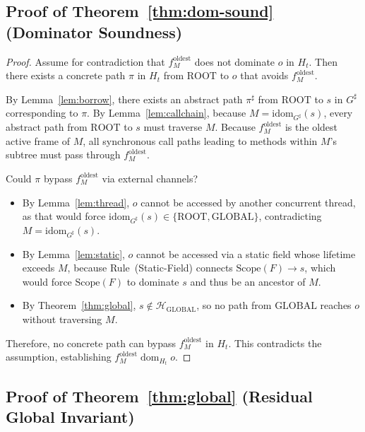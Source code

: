 \documentclass[12pt,a4paper]{article}
\newcommand{\GLOBAL}{\text{GLOBAL}}
\newcommand{\ROOT}{\text{ROOT}}
\newcommand{\idom}{\text{idom}}
\newcommand{\dom}{\mathrel{\text{dom}}}
\newcommand{\Scope}{\text{Scope}}
\begin{document}
\subsection{Proof of Theorem~\ref{thm:dom-sound} (Dominator Soundness)}
\label{sec:proof-thm-dom-sound}

\begin{proof}
Assume for contradiction that $f_M^{\text{oldest}}$ does not dominate $o$ in $H_t$. Then there exists a concrete path $\pi$ in $H_t$ from $\ROOT$ to $o$ that avoids $f_M^{\text{oldest}}$.

By Lemma~\ref{lem:borrow}, there exists an abstract path $\pi^\sharp$ from $\ROOT$ to $s$ in $G^\sharp$ corresponding to $\pi$. By Lemma~\ref{lem:callchain}, because $M = \idom_{G^\sharp}(s)$, every abstract path from $\ROOT$ to $s$ must traverse $M$. Because $f_M^{\text{oldest}}$ is the oldest active frame of $M$, all synchronous call paths leading to methods within $M$'s subtree must pass through $f_M^{\text{oldest}}$.

Could $\pi$ bypass $f_M^{\text{oldest}}$ via external channels?
\begin{itemize}[leftmargin=*]
  \item By Lemma~\ref{lem:thread}, $o$ cannot be accessed by another concurrent thread, as that would force $\idom_{G^\sharp}(s) \in \{\ROOT, \GLOBAL\}$, contradicting $M = \idom_{G^\sharp}(s)$.
  \item By Lemma~\ref{lem:static}, $o$ cannot be accessed via a static field whose lifetime exceeds $M$, because Rule~(Static-Field) connects $\Scope(F) \to s$, which would force $\Scope(F)$ to dominate $s$ and thus be an ancestor of $M$.
  \item By Theorem~\ref{thm:global}, $s \notin \mathcal{H}_{\GLOBAL}$, so no path from $\GLOBAL$ reaches $o$ without traversing $M$.
\end{itemize}
Therefore, no concrete path can bypass $f_M^{\text{oldest}}$ in $H_t$. This contradicts the assumption, establishing $f_M^{\text{oldest}} \dom_{H_t} o$.
\end{proof}

\subsection{Proof of Theorem~\ref{thm:global} (Residual Global Invariant)}
\label{sec:proof-thm-global}
\end{document}
